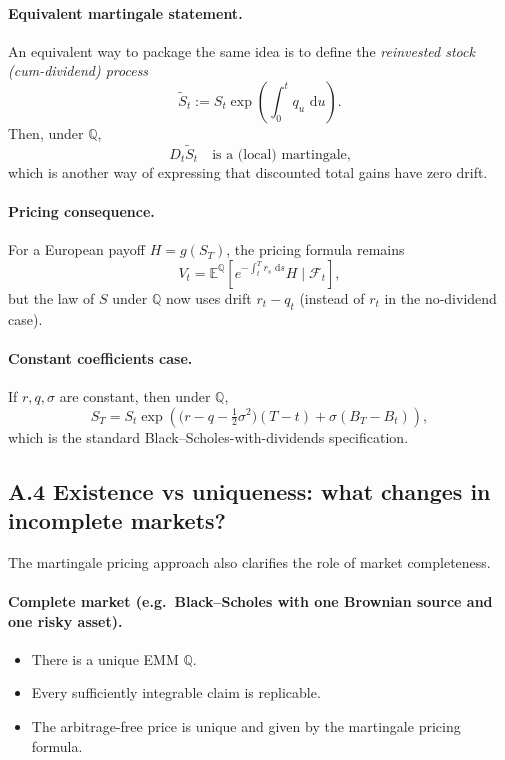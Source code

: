 \documentclass[11pt]{article}
\newcommand{\Qbb}{\mathbb{Q}}
\newcommand{\E}{\mathbb{E}}
\newcommand{\dd}{\,\mathrm{d}}
\newcommand{\1}{\mathbf{1}}
\begin{document}
\paragraph{Equivalent martingale statement.}
An equivalent way to package the same idea is to define the \emph{reinvested stock (cum-dividend) process}
$$
\widetilde S_t
:= S_t \exp\!\left(\int_0^t q_u\,\dd u\right).
$$
Then, under \(\Qbb\),
$$
D_t\widetilde S_t
\quad\text{is a (local) martingale,}
$$
which is another way of expressing that discounted total gains have zero drift.

\paragraph{Pricing consequence.}
For a European payoff \(H=g(S_T)\), the pricing formula remains
$$
V_t=\E^{\Qbb}\!\left[e^{-\int_t^T r_s\,\dd s}H\mid \mathcal F_t\right],
$$
but the law of \(S\) under \(\Qbb\) now uses drift \(r_t-q_t\) (instead of \(r_t\) in the no-dividend case).

\paragraph{Constant coefficients case.}
If \(r,q,\sigma\) are constant, then under \(\Qbb\),
$$
S_T=S_t\exp\!\left(\Big(r-q-\tfrac12\sigma^2\Big)(T-t)+\sigma(B_T-B_t)\right),
$$
which is the standard Black--Scholes-with-dividends specification.


\subsection*{A.4 Existence vs uniqueness: what changes in incomplete markets?}

The martingale pricing approach also clarifies the role of market completeness.

\paragraph{Complete market (e.g.\ Black--Scholes with one Brownian source and one risky asset).}
\begin{itemize}[leftmargin=1.4em]
    \item There is a unique EMM \(\Qbb\).
    \item Every sufficiently integrable claim is replicable.
    \item The arbitrage-free price is unique and given by the martingale pricing formula.
\end{itemize}
\end{document}
